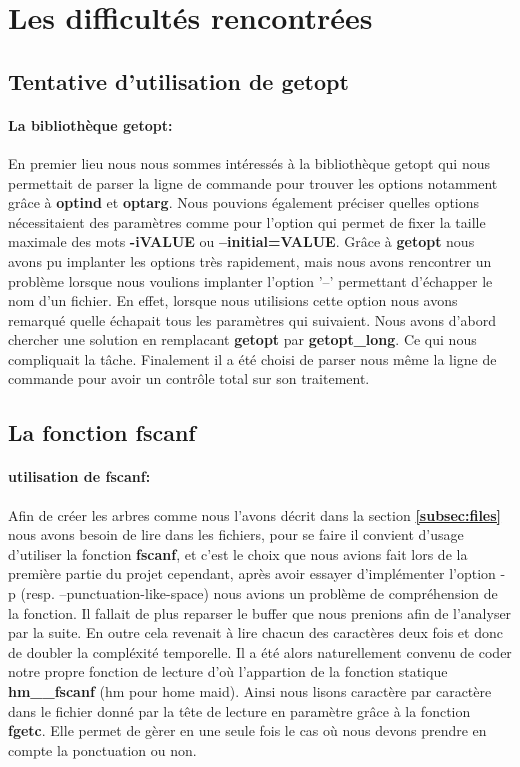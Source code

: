 \documentclass{article}
\begin{document}
\section{Les difficultés rencontrées}

\subsection{Tentative d'utilisation de getopt}
\paragraph{La bibliothèque getopt:} 
En premier lieu nous nous sommes intéressés à la bibliothèque getopt qui nous permettait de parser 
la ligne de commande pour trouver les options notamment grâce à \textbf{optind} et \textbf{optarg}. Nous pouvions également préciser 
quelles options nécessitaient des paramètres comme pour l'option qui permet de fixer la taille 
maximale des mots \textbf{-iVALUE} ou \textbf{--initial=VALUE}. Grâce à \textbf{getopt}
nous avons pu implanter les options très rapidement, mais nous avons rencontrer un problème 
lorsque nous voulions implanter l'option '--' permettant d'échapper le nom d'un fichier.
En effet, lorsque nous utilisions cette option nous avons remarqué quelle échapait tous les 
paramètres qui suivaient. Nous avons d'abord chercher une solution en remplacant \textbf{getopt}
par \textbf{getopt\_long}. Ce qui nous compliquait la tâche. Finalement il a été choisi de parser
nous même la ligne de commande pour avoir un contrôle total sur son traitement.

\subsection{La fonction fscanf}\label{subsec:fscanf}
\paragraph{utilisation de fscanf:}
Afin de créer les arbres comme nous l'avons décrit dans la section \textbf{\ref{subsec:files}} nous avons
besoin de lire dans les fichiers, pour se faire il convient d'usage d'utiliser la fonction \textbf{fscanf}, et c'est le choix
que nous avions fait lors de la première partie du projet cependant, après avoir essayer d'implémenter l'option 
-p (resp. --punctuation-like-space) nous avions un problème de compréhension de la fonction. Il fallait de plus
reparser le buffer que nous prenions afin de l'analyser par la suite. En outre cela revenait à lire chacun des caractères
deux fois et donc de doubler la compléxité temporelle. Il a été alors naturellement convenu de coder notre propre
fonction de lecture  d'où l'appartion de la fonction statique \textbf{hm\_\_fscanf} (hm pour home maid). Ainsi nous lisons
caractère par caractère dans le fichier donné par la tête de lecture en paramètre grâce à la fonction \textbf{fgetc}.
Elle permet de gèrer en une seule fois le cas où nous devons prendre en compte la ponctuation ou non.
\end{document}
